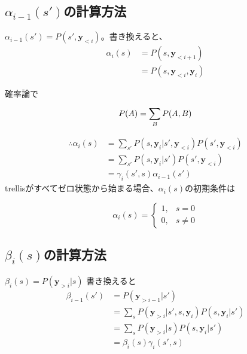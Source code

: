 \documentclass[20 pts]{article}
\begin{document}
\subsection{$\alpha_{i-1}(s')$の計算方法}
$\alpha_{i-1}(s')=P(s',\boldsymbol{y}_{<i})$。書き換えると、
\begin{equation}
\begin{split}
\alpha_{i}(s)&=P(s,\boldsymbol{y}_{<i+1})\\
&=P(s,\boldsymbol{y}_{<i},\boldsymbol{y}_{i})
\end{split}
\end{equation}

確率論で
\begin{equation}
P(A)=\sum_{B}^{}P(A,B)\\
\end{equation}

\begin{equation}
\begin{split}
\therefore \alpha_i(s)&=\sum_{s'}^{}P(s,\boldsymbol{y}_{i}|s',\boldsymbol{y}_{<i})P(s',\boldsymbol{y}_{<i})\\
&=\sum_{s'}^{}P(s,\boldsymbol{y}_{i}|s')P(s',\boldsymbol{y}_{<i})\\
&=\gamma_i(s',s)\alpha_{i-1}(s')
\end{split}
\end{equation}
	trellisがすべてゼロ状態から始まる場合、$\alpha_i(s)$の初期条件は

\[
    \alpha_i(s)= 
\begin{cases}
   1,& s= 0\\        0,              &  s\neq 0
\end{cases}
\]

\subsection{$\beta_i(s)$の計算方法}
$\beta_i(s)=P(\boldsymbol{y}_{>i}|s)$
書き換えると
\begin{equation}
\begin{split}
\beta_{i-1}(s')&=P(\boldsymbol{y}_{>i-1}|s')\\
&=\sum_{s}^{}P(\boldsymbol{y}_{>i}|s',s,\boldsymbol{y}_{i})P(s,\boldsymbol{y}_{i}|s')\\
&=\sum_{s}^{}P(\boldsymbol{y}_{>i}|s)P(s,\boldsymbol{y}_{i}|s')\\
&=\beta_i(s)\gamma_i(s',s)
\end{split}
\end{equation}
\end{document}
